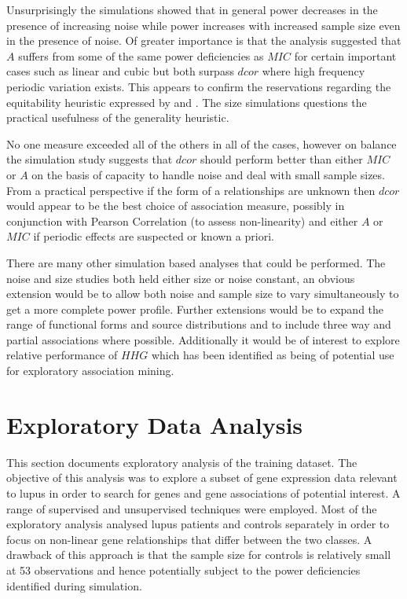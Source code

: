 \documentclass[a4paper, 12pt]{report}
\begin{document}
Unsurprisingly the simulations showed that in general power decreases in the presence of increasing noise while power increases with increased sample size even in the presence of noise. Of greater importance is that the analysis suggested that $A$ suffers from some of the same power deficiencies as $MIC$ for certain important cases such as linear and cubic but both surpass $dcor$ where high frequency periodic variation exists. This appears to confirm the reservations regarding the equitability heuristic expressed by \citet{Kinney19082014} and \citet{Tibshirani2011}. The size simulations questions the practical usefulness of the generality heuristic.

No one measure exceeded all of the others in all of the cases, however on balance the simulation study suggests that $dcor$ should perform better than either $MIC$ or $A$ on the basis of capacity to handle noise and deal with small sample sizes. From a practical perspective if the form of a relationships are unknown then $dcor$ would appear to be the best choice of association measure, possibly in conjunction with Pearson Correlation (to assess non-linearity) and either $A$ or $MIC$ if periodic effects are suspected or known a priori.

There are many other simulation based analyses that could be performed. The noise and size studies both held either size or noise constant, an obvious extension would be to allow both noise and sample size to vary simultaneously to get a more complete power profile.  Further extensions would be to expand the range of functional forms and source distributions and to include three way and partial associations where possible. Additionally it would be of interest to explore  relative performance of $HHG$ \cite{HHG} which has been identified as being of potential use for exploratory association mining. 

\chapter{Exploratory Data Analysis} 
This section documents exploratory analysis of the training dataset. The objective of this analysis was to explore a subset of gene expression data relevant to lupus in order to search for genes and gene associations of potential interest. A range of supervised and unsupervised techniques were employed. Most of the exploratory analysis analysed lupus patients and controls separately in order to focus on non-linear gene relationships that differ between the two classes. A drawback of this approach is that the sample size for controls is relatively small at 53 observations and hence potentially subject to the power deficiencies identified during simulation.
\end{document}
